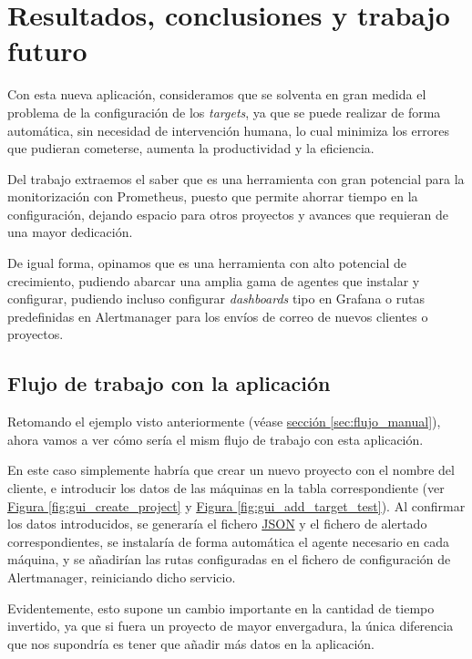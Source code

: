 \chapter{Resultados, conclusiones y trabajo futuro}

Con esta nueva aplicación, consideramos que se solventa en gran medida el problema de la configuración de los	\textit{targets}, ya que se puede realizar de forma automática, sin necesidad de intervención humana, lo cual minimiza los errores que pudieran cometerse, aumenta la productividad y la eficiencia.

Del trabajo extraemos el saber que es una herramienta con gran potencial para la monitorización con Prometheus, puesto que permite ahorrar tiempo en la configuración, dejando espacio para otros proyectos y avances que requieran de una mayor dedicación.

De igual forma, opinamos que es una herramienta con alto potencial de crecimiento, pudiendo abarcar una amplia gama de agentes que instalar y configurar, pudiendo incluso configurar \textit{dashboards} tipo en Grafana o rutas predefinidas en Alertmanager para los envíos de correo de nuevos clientes o proyectos.

\section*{Flujo de trabajo con la aplicación}

Retomando el ejemplo visto anteriormente (véase \hyperref[sec:flujo_manual]{sección \ref{sec:flujo_manual}}), ahora vamos a ver cómo sería el mism flujo de trabajo con esta aplicación.

En este caso simplemente habría que crear un nuevo proyecto con el nombre del cliente, e introducir los datos de las máquinas en la tabla correspondiente (ver \hyperref[fig:gui_create_project]{Figura \ref{fig:gui_create_project}} y \hyperref[fig:gui_add_target_test]{Figura \ref{fig:gui_add_target_test}}). Al confirmar los datos introducidos, se generaría el fichero \url{JSON} y el fichero de alertado correspondientes, se instalaría de forma automática el agente necesario en cada máquina, y se añadirían las rutas configuradas en el fichero de configuración de Alertmanager, reiniciando dicho servicio.

Evidentemente, esto supone un cambio importante en la cantidad de tiempo invertido, ya que si fuera un proyecto de mayor envergadura, la única diferencia que nos supondría es tener que añadir más datos en la aplicación.